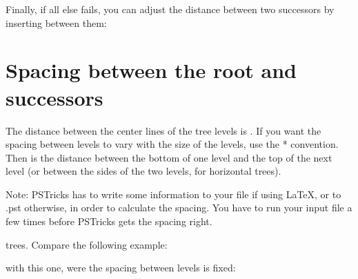 \documentclass[11pt,english,BCOR10mm,DIV12,bibliography=totoc,parskip=false,smallheadings
    headexclude,footexclude,oneside]{pst-doc}
\begin{document}
Finally, if all else fails, you can adjust the distance between two successors 
by inserting  between them:

\begin{LTXexample}[pos=l,width=0.4\linewidth]
\end{LTXexample}

\section{Spacing between the root and successors}

The distance between the center lines of the tree levels is .
If you want the spacing between levels to vary with the size of the levels,
use the * convention. Then  is the distance between the bottom of
one level and the top of the next level (or between the sides of the two
levels, for horizontal trees).

Note: PSTricks has to write some information to your  file if using
\LaTeX, or to .pst otherwise, in order to calculate the spacing.
You have to run your input file a few times before PSTricks gets the spacing
right.



trees. Compare the following example:

\begin{LTXexample}
  \def\psedge#1#2{\ncdiagg[nodesep=3pt,angleA=180,armA=0]{#2}{#1}}
\end{LTXexample}

with this one, were the spacing between levels is fixed:

\begin{LTXexample}
  \def\psedge#1#2{\ncdiagg[nodesep=3pt,angleA=180,armA=0]{#2}{#1}}
\end{LTXexample}

\end{document}
